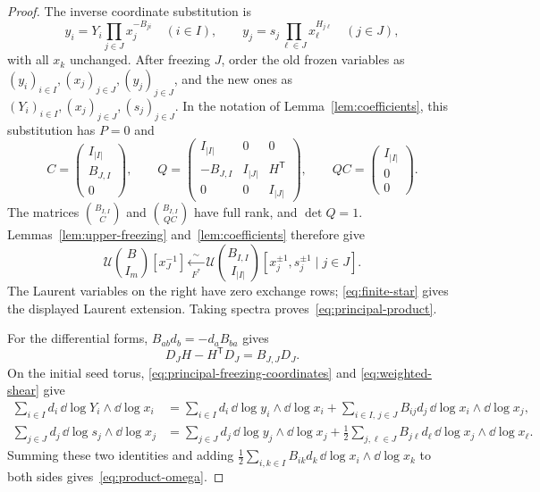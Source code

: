 \documentclass[12pt, letter]{amsart}
\theoremstyle{definition}
\newcommand{\U}{\mathscr U}
\numberwithin{equation}{section}
\begin{document}
\begin{proof}
The inverse coordinate substitution is
\[
 y_i=Y_i\prod_{j\in J}x_j^{-B_{ji}}\quad(i\in I),\qquad
 y_j=s_j\prod_{\ell\in J}x_\ell^{H_{j\ell}}\quad(j\in J),
\]
with all $x_k$ unchanged. After freezing $J$, order the old frozen variables
as $(y_i)_{i\in I},(x_j)_{j\in J},(y_j)_{j\in J}$,
and the new ones as $(Y_i)_{i\in I},(x_j)_{j\in J},(s_j)_{j\in J}$.
In the notation of Lemma~\ref{lem:coefficients}, this substitution has $P=0$ and
\[
 C=\begin{pmatrix}I_{|I|}\\B_{J,I}\\0\end{pmatrix},\qquad
 Q=\begin{pmatrix}
 I_{|I|}&0&0\\-B_{J,I}&I_{|J|}&H^{\mathsf T}\\0&0&I_{|J|}
 \end{pmatrix},\qquad
 QC=\begin{pmatrix}I_{|I|}\\0\\0\end{pmatrix}.
\]
The matrices $\binom{B_{I,I}}{C}$ and $\binom{B_{I,I}}{QC}$ have full rank, and $\det Q=1$.
Lemmas~\ref{lem:upper-freezing} and~\ref{lem:coefficients} therefore give
\[
 \U\binom{B}{I_m}[x_J^{-1}]
 \xleftarrow[\ F^*\ ]{\sim}\U\binom{B_{I,I}}{I_{|I|}}
       [x_j^{\pm1},s_j^{\pm1}\mid j\in J].
\]
The Laurent variables on the right have zero exchange rows;
\eqref{eq:finite-star} gives the displayed Laurent extension.
Taking spectra proves~\eqref{eq:principal-product}.

For the differential forms, $B_{ab}d_b=-d_aB_{ba}$ gives
\begin{equation}\label{eq:weighted-shear}
 D_JH-H^{\mathsf T}D_J=B_{J,J}D_J.
\end{equation}
On the initial seed torus, \eqref{eq:principal-freezing-coordinates} and \eqref{eq:weighted-shear} give
\[
 \begin{aligned}
 \sum_{i\in I}d_i\,\dd\log Y_i\wedge\dd\log x_i
 &=\sum_{i\in I}d_i\,\dd\log y_i\wedge\dd\log x_i +\sum_{i\in I,\,j\in J}B_{ij}d_j\, \dd\log x_i\wedge\dd\log x_j,\\
 \sum_{j\in J}d_j\,\dd\log s_j\wedge\dd\log x_j
 &=\sum_{j\in J}d_j\,\dd\log y_j\wedge\dd\log x_j + \frac12\sum_{j,\ell\in J}B_{j\ell}d_\ell\, \dd\log x_j\wedge\dd\log x_\ell.
 \end{aligned}
\]
Summing these two identities and adding
$\frac12\sum_{i,k\in I}B_{ik}d_k\,
\dd\log x_i\wedge\dd\log x_k$ to both sides gives~\eqref{eq:product-omega}.
\end{proof}
\end{document}
